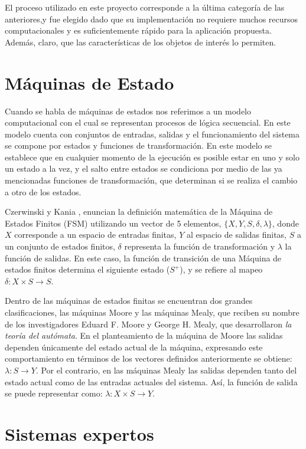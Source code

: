 El proceso utilizado en este proyecto corresponde a la última categoría de las anteriores,y fue elegido dado que su implementación no requiere muchos recursos computacionales y es suficientemente rápido para la aplicación propuesta. Además, claro, que las características de los objetos de interés lo permiten.


\section{Máquinas de Estado}

Cuando se habla de máquinas de estados nos referimos a un modelo computacional con el cual se representan procesos de lógica secuencial. En este modelo cuenta con conjuntos de entradas, salidas y el funcionamiento del sistema se compone por estados y funciones de transformación. En este modelo se establece que en cualquier momento de la ejecución es posible estar en uno y solo un estado a la vez, y el salto entre estados se condiciona por medio de las ya mencionadas funciones de transformación, que determinan si se realiza el cambio a otro de los estados.

Czerwinski y Kania \cite{czerwinski_definitions_2013}, enuncian la definición matemática de la Máquina de Estados Finitos (FSM) utilizando un vector de 5 elementos, $\{X,Y,S,\delta,\lambda\}$, donde $X$ corresponde a un espacio de entradas finitas, $Y$ al espacio de salidas finitas, $S$ a un conjunto de estados finitos, $\delta$ representa la función de transformación y $\lambda$ la función de salidas. En este caso, la función de transición de una Máquina de estados finitos determina el siguiente estado ($S^+$), y se refiere al mapeo $\delta: X \times S \to S $.


Dentro de las máquinas de estados finitas se encuentran dos grandes clasificaciones, las máquinas Moore y las máquinas Mealy, que reciben su nombre de los investigadores Eduard F. Moore y George H. Mealy, que desarrollaron \textit{la teoría del autómata}. En el planteamiento de la máquina de Moore las salidas dependen únicamente del estado actual de la máquina, expresando este comportamiento en términos de los vectores definidos anteriormente se obtiene: $\lambda: S \to Y$. Por el contrario, en las máquinas Mealy las salidas dependen tanto del estado actual como de las entradas actuales del sistema. Así, la función de salida se puede representar como: $\lambda: X \times S \to Y$.


\section{Sistemas expertos}
 
